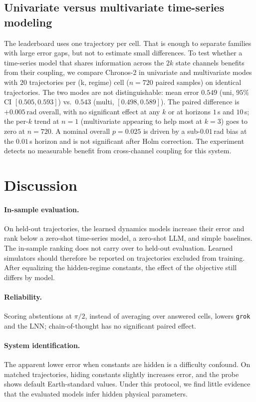\documentclass{article}
\begin{document}
\subsection{Univariate versus multivariate time-series modeling}
\label{sec:multivariate}
The leaderboard uses one trajectory per cell. That is enough to separate families with large
error gaps, but not to estimate small differences. To test whether a time-series model that
shares information across the $2k$ state channels benefits from their coupling, we compare
Chronos-2 in univariate and
multivariate modes with $20$ trajectories per (k, regime) cell ($n{=}720$ paired samples) on
identical trajectories. The two modes are not distinguishable: mean error $0.549$ (uni, $95\%$
CI $[0.505,0.593]$) vs.\ $0.543$ (multi, $[0.498,0.589]$). The paired difference is
$+0.005$\,rad overall, with no significant effect at any $k$ or at horizons $1$\,s and
$10$\,s; the per-$k$ trend at $n{=}1$ (multivariate appearing to help most at $k{=}3$) goes
to zero at $n{=}720$. A nominal overall $p{=}0.025$ is driven by a sub-$0.01$\,rad bias at
the $0.01$\,s horizon and is not significant after Holm correction. The experiment detects no
measurable benefit from cross-channel coupling for this system.

\section{Discussion}
\paragraph{In-sample evaluation.} On held-out trajectories, the
learned dynamics models increase their error and rank below a zero-shot time-series model, a
zero-shot LLM, and simple baselines. The in-sample ranking does not carry over to held-out
evaluation. Learned simulators should therefore be reported on trajectories excluded from
training. After equalizing the hidden-regime constants, the effect of the objective still
differs by model.

\paragraph{Reliability.} Scoring abstentions at $\pi/2$, instead of averaging over answered
cells, lowers \texttt{grok} and the LNN; chain-of-thought has no significant paired effect.

\paragraph{System identification.} The apparent lower error when constants are hidden is a
difficulty confound. On matched trajectories, hiding constants slightly increases error, and
the probe shows default Earth-standard values. Under this protocol, we find little evidence
that the evaluated models infer hidden physical parameters.
\end{document}
